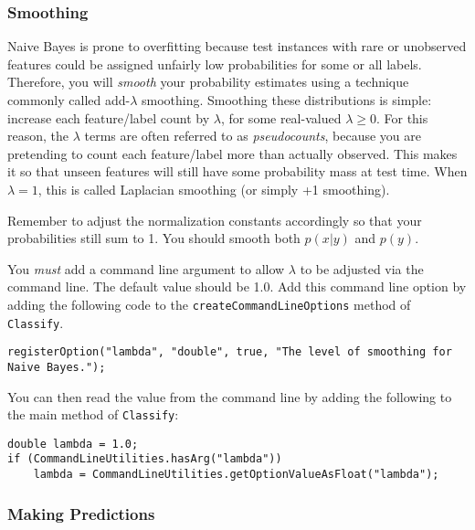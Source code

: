 \documentclass[11pt]{article}
\newcommand{\code}[1]{{\footnotesize \tt #1}}
\begin{document}
\subsubsection{Smoothing}

Naive Bayes is prone to overfitting because test instances with rare or unobserved features could be assigned unfairly low probabilities for some or all labels. 
Therefore, you will {\em smooth} your probability estimates using a technique commonly called add-$\lambda$ smoothing. Smoothing these distributions is simple: increase each feature/label count by $\lambda$, for some real-valued $\lambda \ge 0$. For this reason, the $\lambda$ terms are often referred to as {\em pseudocounts}, because you are pretending to count each feature/label more than actually observed. This makes it so that unseen features will still have some probability mass at test time.
When $\lambda=1$, this is called Laplacian smoothing (or simply +1 smoothing). 

Remember to adjust the normalization constants accordingly so that your probabilities still sum to 1. You should smooth both $p(x|y)$ and $p(y)$.



You {\em must} add a command line argument to allow $\lambda$ to be adjusted via the command line. The default value should be 1.0.
Add this command line option by adding the following code to the \code{createCommandLineOptions} method of \code{Classify}.
\begin{footnotesize}
\begin{verbatim}
registerOption("lambda", "double", true, "The level of smoothing for Naive Bayes.");
\end{verbatim}
\end{footnotesize}

You can then read the value from the command line by adding the following to the main method of \code{Classify}:
\begin{footnotesize}
\begin{verbatim}
double lambda = 1.0;
if (CommandLineUtilities.hasArg("lambda"))
    lambda = CommandLineUtilities.getOptionValueAsFloat("lambda");
\end{verbatim}
\end{footnotesize}



\subsubsection{Making Predictions}
\end{document}

